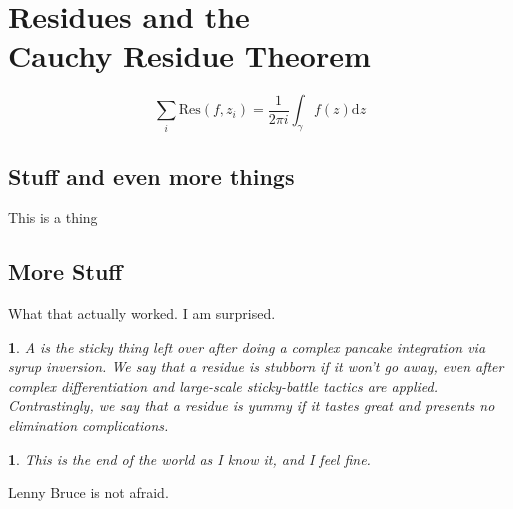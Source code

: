\documentclass[10pt]{article}
\theoremstyle{marginlab}
\newtheorem{margindef}{\color{accol}{Definition}}
\numberwithin{margindef}{section}
\theoremstyle{marginlab}
\newtheorem{marginthm}{\color{accol}{Theorem}}
\numberwithin{marginthm}{section}
\begin{document}
\section{Residues and the\\Cauchy Residue Theorem}
\marginpar{

	}
\lipsum[2]

\begin{equation}
\sum_i  \mathrm{Res}\left(f, z_i\right) = \frac{1}{2\pi i} \int_\gamma f(z) \mathrm{d}z
\end{equation}
\lipsum[1]

\subsection{Stuff and even more things} This is a thing
\subsection{More Stuff}

What that actually worked. I am surprised. \lipsum[1]
\begin{margindef}
A {\color{accol}{residue}} is the sticky thing left over after doing a complex pancake integration via syrup inversion.
We say that a residue is stubborn if it won't go away, even after complex differentiation and large-scale sticky-battle tactics are applied. Contrastingly, we say that a residue is yummy if it tastes great and presents no elimination complications.
\end{margindef}

\begin{marginthm}
	This is the end of the world as I know it, and I feel fine.
\end{marginthm}


Lenny Bruce is not afraid. \lipsum[8]
\end{document}

